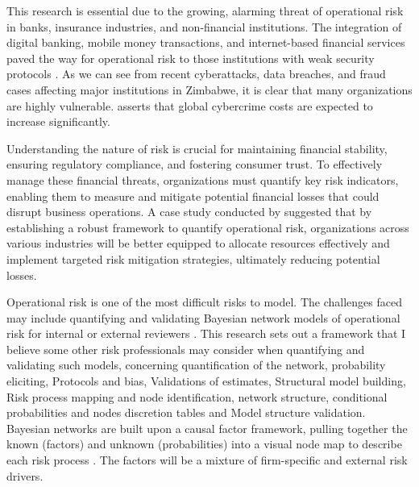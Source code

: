 This research is essential due to the growing, alarming threat of operational risk in banks, insurance industries, and non-financial institutions. The integration of digital banking, mobile money transactions, and internet-based financial services paved the way for operational risk to those institutions with weak security protocols \parencite{cybersecurity2024}. As we can see from recent cyberattacks, data breaches, and fraud cases affecting major institutions in Zimbabwe, it is clear that many organizations are highly vulnerable. \textcite{madzudzo2021cybersecurity} asserts that global cybercrime costs are expected to increase significantly. 

Understanding the nature of risk is crucial for maintaining financial stability, ensuring regulatory compliance, and fostering consumer trust. To effectively manage these financial threats, organizations must quantify key risk indicators, enabling them to measure and mitigate potential financial losses that could disrupt business operations. A case study conducted by \textcite{ey2025operationalrisk} suggested that by establishing a robust framework to quantify operational risk, organizations across various industries will be better equipped to allocate resources effectively and implement targeted risk mitigation strategies, ultimately reducing potential losses. 

Operational risk is one of the most difficult risks to model. The challenges faced may include quantifying and validating Bayesian network models of operational risk for internal or external reviewers \parencite{zhang2023bayesian}. This research sets out a framework that I believe some other risk professionals may consider when quantifying and validating such models, concerning quantification of the network, probability eliciting, Protocols and bias, Validations of estimates, Structural model building, Risk process mapping and node identification, network structure, conditional probabilities and nodes discretion tables and Model structure validation. Bayesian networks are built upon a causal factor framework, pulling together the known (factors) and unknown (probabilities) into a visual node map to describe each risk process \parencite{ifoa2023operationalrisk}. The factors will be a mixture of firm-specific and external risk drivers.


